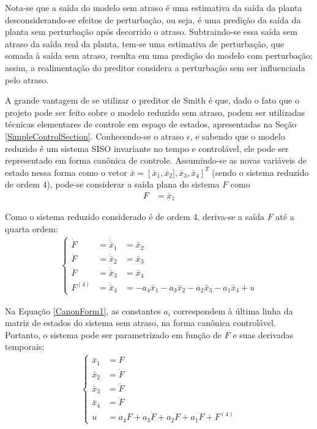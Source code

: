 Nota-se que a saída do modelo sem atraso é uma estimativa da saída da planta desconsiderando-se efeitos de perturbação, ou seja, é uma predição da saída da planta sem perturbação após decorrido o atraso. Subtraindo-se essa saída sem atraso da saída real da planta, tem-se uma estimativa de perturbação, que somada à saída sem atraso, resulta em uma predição do modelo com perturbação; assim, a realimentação do preditor considera a perturbação sem ser influenciada pelo atraso.

A grande vantagem de se utilizar o preditor de Smith é que, dado o fato que o projeto pode ser feito sobre o modelo reduzido sem atraso, podem ser utilizadas técnicas elementares de controle em espaço de estados, apresentadas na Seção \ref{SimpleControlSection}. Conhecendo-se o atraso $\epsilon$, e sabendo que o modelo reduzido é um sistema SISO invariante no tempo e controlável, ele pode ser representado em forma canônica de controle. Assumindo-se as novas variáveis de estado nessa forma como o vetor $\bar{x} = \left[\bar{x}_1, \bar{x}_2], \bar{x}_3, \bar{x}_4\right]^T$ (sendo o sistema reduzido de ordem 4), pode-se considerar a saída plana do sistema $F$ como \begin{align}
 F &= \bar{x}_1
\end{align}

Como o sistema reduzido considerado é de ordem 4, deriva-se a saída $F$ até a quarta ordem:
\begin{align}
\label{CanonForm1} \left\{
 \begin{array}{lll}
\dot{F} &= \dot{\bar{x}}_1 &= \bar{x}_2 \\
\ddot{F} &= \dot{\bar{x}}_2 &= \bar{x}_3 \\
\dddot{F} &= \dot{\bar{x}}_3 &= \bar{x}_4 \\
F^{(4)} &= \dot{\bar{x}}_4 &= -a_4\bar{x}_1 -a_3\bar{x}_2 -a_2\bar{x}_3 -a_1\bar{x}_4 + u
\end{array}
\right.
\end{align}

Na Equação \ref{CanonForm1}, as constantes $a_i$ correspondem à última linha da matriz de estados do sistema sem atraso, na forma canônica controlável. Portanto, o sistema pode ser parametrizado em função de $F$ e suas derivadas temporais:
\begin{align}
\left \{
\begin{array}{ll}
\bar{x}_1 &= F \\
\bar{x}_2 &= \dot{F} \\
\bar{x}_3 &= \ddot{F} \\
\bar{x}_4 &= \dddot{F} \\
u &= a_4 F + a_3 \dot{F} + a_2 \ddot{F} + a_1 \dddot{F} + F^{(4)}
\end{array}
\right.
\end{align}

